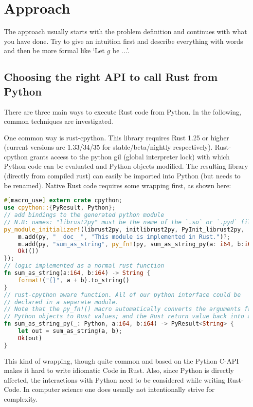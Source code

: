 \chapter{Approach}\label{chap:approach}
The approach usually starts with the problem definition and continues with what you have done. Try to give an intuition first and describe everything with words and then be more formal like `Let $g$ be ...'.



\section{Choosing the right API to call Rust from Python}

There are three main ways to execute Rust code from Python. In the following, common techniques are investigated.

One common way is rust-cpython. This library requires Rust 1.25 or higher (current versions are 1.33/34/35 for stable/beta/nightly respectively). Rust-cpython grants access to the python gil (global interpreter lock) with which Python code can be evaluated and Python objects modified. The resulting library (directly from compiled rust) can easily be imported into Python (but needs to be renamed). Native Rust code requires some wrapping first, as shown here:
\begin{lstlisting}[language=Rust]
#[macro_use] extern crate cpython;
use cpython::{PyResult, Python};
// add bindings to the generated python module
// N.B: names: "librust2py" must be the name of the `.so` or `.pyd` file
py_module_initializer!(librust2py, initlibrust2py, PyInit_librust2py, |py, m| {
    m.add(py, "__doc__", "This module is implemented in Rust.")?;
    m.add(py, "sum_as_string", py_fn!(py, sum_as_string_py(a: i64, b:i64)))?;
    Ok(())
});
// logic implemented as a normal rust function
fn sum_as_string(a:i64, b:i64) -> String {
    format!("{}", a + b).to_string()
}
// rust-cpython aware function. All of our python interface could be
// declared in a separate module.
// Note that the py_fn!() macro automatically converts the arguments from
// Python objects to Rust values; and the Rust return value back into a Python object.
fn sum_as_string_py(_: Python, a:i64, b:i64) -> PyResult<String> {
    let out = sum_as_string(a, b);
    Ok(out)
}
\end{lstlisting}
This kind of wrapping, though quite common and based on the Python C-API makes it hard to write idiomatic Code in Rust. Also, since Python is directly affected, the interactions with Python need to be considered while writing Rust-Code. In computer science one does usually not intentionally strive for complexity.


